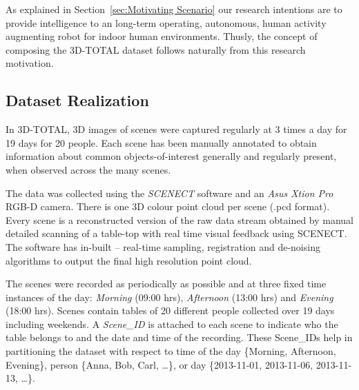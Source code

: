 \documentclass[letterpaper, 10 pt, conference]{ieeeconf}  %
\begin{document}
As explained in Section~\ref{sec:Motivating Scenario} our research intentions are to provide intelligence to an long-term operating, autonomous, human activity augmenting robot for indoor human environments. Thusly, the concept of composing the 3D-TOTAL dataset follows naturally from this research motivation.

\subsection{Dataset Realization}
\label{ssec:Dataset Realization}
In 3D-TOTAL, 3D images of scenes were captured regularly at 3 times a day for 19 days for 20 people. Each scene has been manually annotated to obtain information about common objects-of-interest generally and regularly present, when observed across the many scenes.

The data was collected using the \textit{SCENECT} software \cite{Buerkler:Online2012} and an \textit{Asus Xtion Pro} RGB-D camera. There is one 3D colour point cloud per scene (.pcd format). Every scene is a reconstructed version of the raw data stream obtained by manual detailed scanning of a table-top with real time visual feedback using SCENECT. The software has in-built -- real-time sampling, registration and de-noising algorithms to output the final high resolution point cloud.

The scenes were recorded as periodically as possible and at three fixed time instances of the day: \emph{Morning} (09:00 hrs), \emph{Afternoon} (13:00 hrs) and \emph{Evening} (18:00 hrs). Scenes contain tables of 20 different people collected over 19 days including weekends. A \textit{Scene\_ID} is attached to each scene to indicate who the table belongs to and the date and time of the recording. These Scene\_IDs help in partitioning the dataset with respect to time of the day \{Morning, Afternoon, Evening\}, person \{Anna, Bob, Carl, \dots\}, or day \{2013-11-01, 2013-11-06, 2013-11-13, \dots\}.
\end{document}
